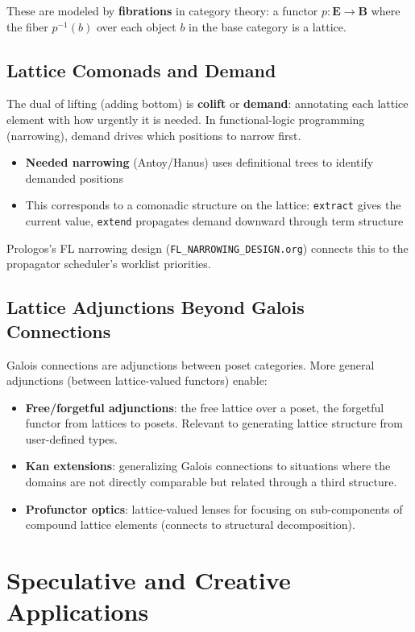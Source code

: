 \documentclass[11pt]{article}
\begin{document}
These are modeled by \textbf{fibrations} in category theory: a functor \(p : \mathbf{E}
\to \mathbf{B}\) where the fiber \(p^{-1}(b)\) over each object \(b\) in the base
category is a lattice.
\subsection{Lattice Comonads and Demand}
\label{sec:orgdb5dc32}

The dual of lifting (adding bottom) is \textbf{colift} or \textbf{demand}: annotating each
lattice element with how urgently it is needed. In functional-logic programming
(narrowing), demand drives which positions to narrow first.

\begin{itemize}
\item \textbf{Needed narrowing} (Antoy/Hanus) uses definitional trees to identify demanded
positions
\item This corresponds to a comonadic structure on the lattice: \texttt{extract} gives the
current value, \texttt{extend} propagates demand downward through term structure
\end{itemize}

Prologos's FL narrowing design (\texttt{FL\_NARROWING\_DESIGN.org}) connects this to
the propagator scheduler's worklist priorities.
\subsection{Lattice Adjunctions Beyond Galois Connections}
\label{sec:org7b5b242}

Galois connections are adjunctions between poset categories. More general
adjunctions (between lattice-valued functors) enable:

\begin{itemize}
\item \textbf{Free/forgetful adjunctions}: the free lattice over a poset, the forgetful
functor from lattices to posets. Relevant to generating lattice structure from
user-defined types.
\item \textbf{Kan extensions}: generalizing Galois connections to situations where the
domains are not directly comparable but related through a third structure.
\item \textbf{Profunctor optics}: lattice-valued lenses for focusing on sub-components of
compound lattice elements (connects to structural decomposition).
\end{itemize}
\section{Speculative and Creative Applications}
\label{sec:org34053ca}
\end{document}
